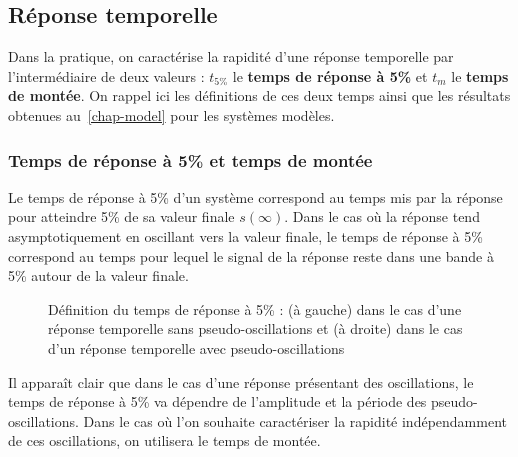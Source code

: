 \subsection{Réponse temporelle}
Dans la pratique, on caractérise la rapidité d'une réponse temporelle par 
l'intermédiaire de deux valeurs : $t_{5\%}$ le \textbf{temps de réponse à 5\%}
et $t_m$ le \textbf{temps de montée}. 
On rappel ici les définitions de ces deux temps ainsi que 
les résultats obtenues au~\cref{chap-model} pour les systèmes modèles.
\subsubsection{Temps de réponse à 5\% et temps de montée}
Le temps de réponse à 5\% d'un système correspond au temps mis par la réponse 
pour atteindre 5\% de sa valeur finale $s(\infty)$. Dans le cas où la réponse 
tend asymptotiquement en oscillant vers la valeur finale, le temps de
réponse à 5\% correspond au temps pour lequel le signal de la réponse reste
dans une bande à 5\% autour de la valeur finale. 
\begin{figure}[!h]
    \centering
    
    
    \caption{Définition du temps de réponse à 5\% : (à gauche) dans le cas
             d'une réponse temporelle sans pseudo-oscillations et (à droite) 
             dans le cas d'un réponse temporelle avec pseudo-oscillations}
\end{figure}
Il apparaît clair que dans le cas d'une réponse présentant des oscillations,
le temps de réponse à 5\% va dépendre de l'amplitude et la période des 
pseudo-oscillations. Dans le cas où l'on souhaite caractériser la rapidité
indépendamment de ces oscillations, on utilisera le temps de montée.

